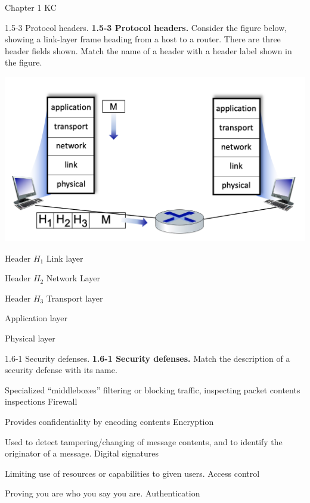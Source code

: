 \documentclass[a4paper]{article}
\begin{document}
\begin{quiz}{Chapter 1 KC}
\begin{matching}[points=1]{1.5-3 Protocol headers.}
\textbf{1.5-3 Protocol headers.}
Consider the figure below, showing a link-layer frame heading from a host to a router. There are three header fields shown. Match the name of a header with a header label shown in the figure. 
\begin{center}
\includegraphics[width=\linewidth]{figs/1.5.3.jpg}
\end{center}
\item Header $H_1$ \answer Link layer
\item Header $H_2$ \answer Network Layer
\item Header $H_3$ \answer Transport layer
\item \answer Application layer
\item \answer Physical layer
\end{matching}

\begin{matching}[points=1]{1.6-1 Security defenses.}
\textbf{1.6-1 Security defenses.}
Match the description of a security defense with its name.
\item Specialized ``middleboxes'' filtering or blocking traffic, inspecting packet contents inspections \answer Firewall
\item Provides confidentiality by encoding contents \answer Encryption
\item Used to detect tampering/changing of message contents, and to identify the originator of a message. \answer Digital signatures
\item Limiting use of resources or capabilities to given users. \answer Access control
\item Proving you are who you say you are. \answer Authentication
\end{matching}


\end{quiz}
\end{document}
